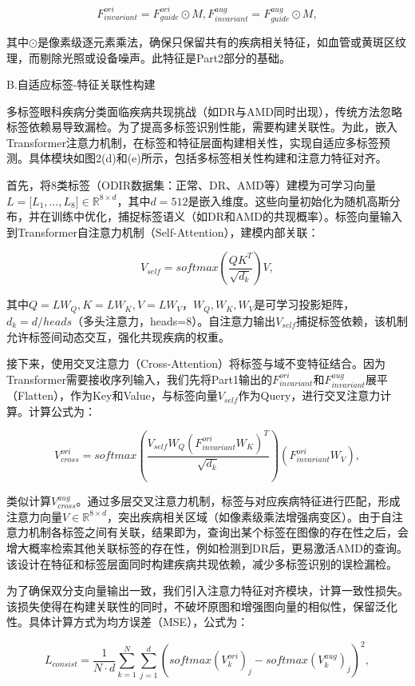 \[F_{invariant}^{ori} = F_{guide}^{ori} \odot M,F_{invariant}^{aug} = F_{guide}^{aug} \odot M,
\]

其中\(\odot\)是像素级逐元素乘法，确保只保留共有的疾病相关特征，如血管或黄斑区纹理，而剔除光照或设备噪声。此特征是Part2部分的基础。

B.自适应标签-特征关联性构建

多标签眼科疾病分类面临疾病共现挑战（如DR与AMD同时出现），传统方法忽略标签依赖易导致漏检。为了提高多标签识别性能，需要构建关联性。为此，嵌入Transformer注意力机制，在标签和特征层面构建相关性，实现自适应多标签预测。具体模块如图2(d)和(e)所示，包括多标签相关性构建和注意力特征对齐。

首先，将8类标签（ODIR数据集：正常、DR、AMD等）建模为可学习向量\(L = \lbrack L_{1},\ldots,L_{8}\rbrack \in \mathbb{R}^{8 \times d}\)，其中\(d = 512\)是嵌入维度。这些向量初始化为随机高斯分布，并在训练中优化，捕捉标签语义（如DR和AMD的共现概率）。标签向量输入到Transformer自注意力机制（Self-Attention），建模内部关联：

\[
V_{self} = softmax\left(\frac{QK^{T}}{\sqrt{d_{k}}}\right)V,
\]

其中\(Q = LW_{Q},K = LW_{K},V = LW_{V}\)，\(W_{Q},W_{K},W_{V}\)是可学习投影矩阵，\(d_{k} = d/heads\)（多头注意力，heads=8）。自注意力输出\(V_{self}\)捕捉标签依赖，该机制允许标签间动态交互，强化共现疾病的权重。

接下来，使用交叉注意力（Cross-Attention）将标签与域不变特征结合。因为Transformer需要接收序列输入，我们先将Part1输出的\(F_{invariant}^{ori}\)和\(F_{invariant}^{aug}\)展平（Flatten），作为Key和Value，与标签向量\(V_{self}\)作为Query，进行交叉注意力计算。计算公式为：

\[
V_{cross}^{ori} = softmax\left(\frac{V_{self}W_{Q}(F_{invariant}^{ori}W_{K})^{T}}{\sqrt{d_{k}}}\right)(F_{invariant}^{ori}W_{V}),
\]

类似计算\(V_{cross}^{aug}\)。通过多层交叉注意力机制，标签与对应疾病特征进行匹配，形成注意力向量\(V \in \mathbb{R}^{8 \times d}\)，突出疾病相关区域（如像素级乘法增强病变区）。由于自注意力机制各标签之间有关联，结果即为，查询出某个标签在图像的存在性之后，会增大概率检索其他关联标签的存在性，例如检测到DR后，更易激活AMD的查询。该设计在特征和标签层面同时构建疾病共现依赖，减少多标签识别的误检漏检。

为了确保双分支向量输出一致，我们引入注意力特征对齐模块，计算一致性损失。该损失使得在构建关联性的同时，不破坏原图和增强图向量的相似性，保留泛化性。具体计算方式为均方误差（MSE），公式为：

\[
L_{consist} = \frac{1}{N \cdot d}\sum_{k = 1}^{N}\sum_{j = 1}^{d}\left( softmax\left( V_{k}^{ori} \right)_{j} - softmax\left( V_{k}^{aug} \right)_{j} \right)^{2},
\]

